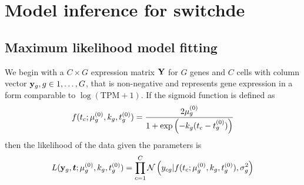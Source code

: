 \chapter{Model inference for switchde}





\section{Maximum likelihood model fitting} \label{app:switchdemle}

We begin with a $C \times G$ expression matrix ${\bf Y}$ for $G$ genes and $C$ cells with column vector ${\bf y}_g, g \in 1, \ldots, G$, that is non-negative and represents gene expression in a form comparable to $\log(\text{TPM} + 1)$. If the sigmoid function is defined as
\begin{equation}
	f(t_c; {\mu^{(0)}_g}, k_g, {t^{(0)}_g}) =
\frac{2 {\mu^{(0)}_g}}{1 + \exp\left( -k_g(t_c - {t^{(0)}_g}) \right)}
\end{equation}
then the likelihood of the data given the parameters is
\begin{equation}
	L({\bf y}_g, \bm t; {\mu^{(0)}_g}, k_g, {t^{(0)}_g}) = \prod_{c = 1}^C \mathcal{N}\left(y_{cg} | f(t_c; {\mu^{(0)}_g}, k_g, {t^{(0)}_g}), \sigma^2_g\right)
\end{equation}

